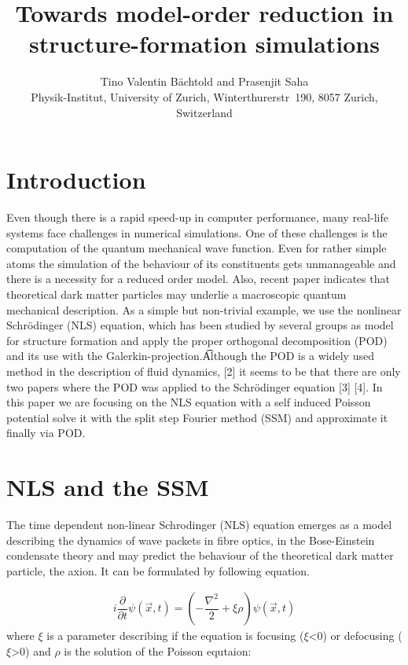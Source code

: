 \documentclass[usenatbib]{mn2e}
\title{Towards model-order reduction in structure-formation simulations}
\author[B\"achtold and Saha]{Tino Valentin B\"achtold and Prasenjit Saha \\
Physik-Institut, University of Zurich, Winterthurerstr~190, 8057 Zurich, Switzerland \\ }
\date{}
\begin{document}
\maketitle

\begin{abstract}
\end{abstract}

\begin{keywords}

\end{keywords}

\section{Introduction}
Even though there is a rapid speed-up in computer performance, many real-life systems face challenges in numerical simulations. One of these challenges is the computation of the quantum mechanical wave function. Even for rather simple atoms the simulation of the behaviour of its constituents gets unmanageable and there is a necessity for a reduced order model. Also, recent paper indicates that theoretical dark matter particles may underlie a macroscopic quantum mechanical description. 
As a simple but non-trivial example, we use the nonlinear
Schr\"odinger (NLS) equation, which has been studied by several groups as
model for structure formation\cite{1993ApJ...416L..71W} and apply the proper orthogonal decomposition (POD) and its use with the Galerkin-projection.\t
Although the POD is a widely used method in the description of fluid dynamics, [2] it seems to be that there are only two papers where the POD was applied to the Schr\"odinger equation [3] [4]. In this paper we are focusing on the NLS equation with a self induced Poisson potential solve it with the split step Fourier method (SSM) and approximate it finally via POD. 
\section{NLS and the SSM}
The time dependent non-linear Schrodinger (NLS) equation emerges as a model describing the dynamics of wave packets in fibre optics, in the Bose-Einstein condensate theory and may predict the behaviour of the theoretical dark matter particle, the axion. It can be formulated by following equation.


\begin{equation} \label{eq1}
\begin{split}
i\dfrac {\partial } {\partial t}\psi( \overrightarrow{x},t) =( -\dfrac {\nabla ^{2}} {2}+ \xi \rho) \psi( \overrightarrow {x},t)
\end{split}
\end{equation}
where \(\xi\) is a parameter describing if the equation is focusing (\(\xi\)\textless  0) or defocusing (\(\xi\)\textgreater0) and \(\rho\) is the solution of the Poisson equtaion:
\end{document}
